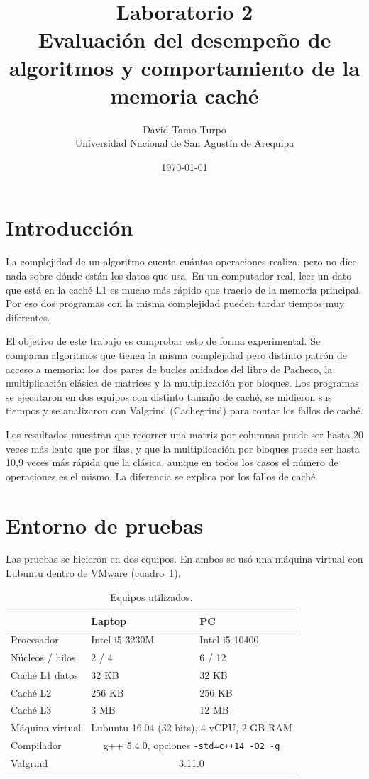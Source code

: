 \documentclass[11pt]{article}
\title{Laboratorio 2\\
Evaluación del desempeño de algoritmos y comportamiento de la memoria caché}
\author{David Tamo Turpo\\Universidad Nacional de San Agustín de Arequipa}
\date{\today}
\begin{document}
\maketitle

\section{Introducción}

La complejidad de un algoritmo cuenta cuántas operaciones realiza, pero no
dice nada sobre dónde están los datos que usa. En un computador real, leer
un dato que está en la caché L1 es mucho más rápido que traerlo de la
memoria principal. Por eso dos programas con la misma complejidad pueden
tardar tiempos muy diferentes.

El objetivo de este trabajo es comprobar esto de forma experimental. Se
comparan algoritmos que tienen la misma complejidad pero distinto patrón de
acceso a memoria: los dos pares de bucles anidados del libro de Pacheco, la
multiplicación clásica de matrices y la multiplicación por bloques. Los
programas se ejecutaron en dos equipos con distinto tamaño de caché, se
midieron sus tiempos y se analizaron con Valgrind (Cachegrind) para contar
los fallos de caché.

Los resultados muestran que recorrer una matriz por columnas puede ser hasta
20 veces más lento que por filas, y que la multiplicación por bloques puede
ser hasta 10,9 veces más rápida que la clásica, aunque en todos los casos el
número de operaciones es el mismo. La diferencia se explica por los fallos
de caché.

\section{Entorno de pruebas}

Las pruebas se hicieron en dos equipos. En ambos se usó una máquina virtual
con Lubuntu dentro de VMware (cuadro~\ref{tab:entorno}).

\begin{table}[H]
\centering
\caption{Equipos utilizados.}
\label{tab:entorno}
\begin{tabular}{lll}
\toprule
 & \textbf{Laptop} & \textbf{PC} \\
\midrule
Procesador & Intel i5-3230M & Intel i5-10400 \\
Núcleos / hilos & 2 / 4 & 6 / 12 \\
Caché L1 datos & 32 KB & 32 KB \\
Caché L2 & 256 KB & 256 KB \\
Caché L3 & 3 MB & 12 MB \\
\midrule
Máquina virtual & \multicolumn{2}{c}{Lubuntu 16.04 (32 bits), 4 vCPU, 2 GB RAM} \\
Compilador & \multicolumn{2}{c}{g++ 5.4.0, opciones \texttt{-std=c++14 -O2 -g}} \\
Valgrind & \multicolumn{2}{c}{3.11.0} \\
\bottomrule
\end{tabular}
\end{table}
\end{document}
